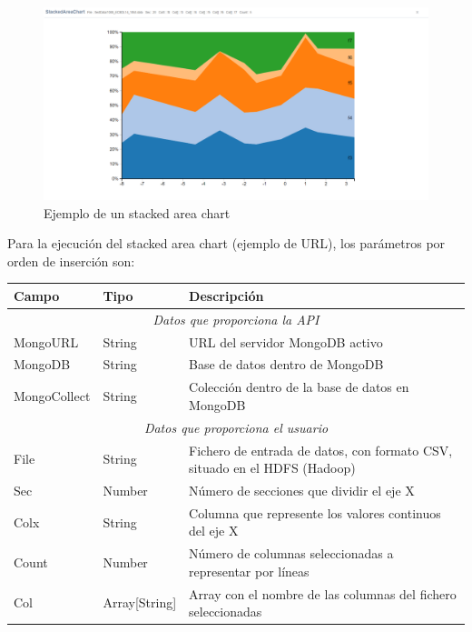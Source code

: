 \begin{figure}
	\centering
	\includegraphics[width=1\linewidth]{imagenes/ejemplo_stackedareachart}
	\caption{Ejemplo de un stacked area chart}
	\label{fig:ejemplostackedareachart}
\end{figure}

Para la ejecución del stacked area chart (ejemplo de URL\footnotemark), los parámetros por orden de inserción son:

\begin{tabular}{|l|l|p{7cm}|}
	\hline 
	\textbf{Campo} & \textbf{Tipo} & \textbf{Descripción} \\ 
	\hline \hline
	\multicolumn{3}{|c|}{\textit{Datos que proporciona la API}} \\
	\hline 
	MongoURL & String & URL del servidor MongoDB activo \\ 
	\hline 
	MongoDB & String & Base de datos dentro de MongoDB \\ 
	\hline 
	MongoCollect& String & Colección dentro de la base de datos en MongoDB \\ 
	\hline \hline
	\multicolumn{3}{|c|}{\textit{Datos que proporciona el usuario}} \\
	\hline 
	File & String & Fichero de entrada de datos, con formato CSV, situado en el HDFS (Hadoop) \\ 
	\hline 
	Sec & Number & Número de secciones que dividir el eje X \\ 
	\hline 
	Colx & String & Columna que represente los valores continuos del eje X \\ 
	\hline 
	Count & Number & Número de columnas seleccionadas a representar por líneas \\ 
	\hline  
	Col & Array[String] & Array con el nombre de las columnas del fichero seleccionadas \\ 
	\hline
\end{tabular} 

